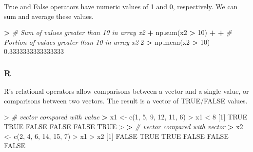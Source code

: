\documentclass[
]{book}
\newenvironment{Shaded}{\begin{snugshade}}{\end{snugshade}}
\newcommand{\BuiltInTok}[1]{#1}
\newcommand{\CommentTok}[1]{\textcolor[rgb]{0.56,0.35,0.01}{\textit{#1}}}
\newcommand{\ConstantTok}[1]{\textcolor[rgb]{0.00,0.00,0.00}{#1}}
\newcommand{\DecValTok}[1]{\textcolor[rgb]{0.00,0.00,0.81}{#1}}
\newcommand{\ErrorTok}[1]{\textcolor[rgb]{0.64,0.00,0.00}{\textbf{#1}}}
\newcommand{\FloatTok}[1]{\textcolor[rgb]{0.00,0.00,0.81}{#1}}
\newcommand{\FunctionTok}[1]{\textcolor[rgb]{0.00,0.00,0.00}{#1}}
\newcommand{\NormalTok}[1]{#1}
\newcommand{\OperatorTok}[1]{\textcolor[rgb]{0.81,0.36,0.00}{\textbf{#1}}}
\newcommand{\OtherTok}[1]{\textcolor[rgb]{0.56,0.35,0.01}{#1}}
\newcommand{\SpecialCharTok}[1]{\textcolor[rgb]{0.00,0.00,0.00}{#1}}
\begin{document}
True and False operators have numeric values of 1 and 0, respectively. We can sum and average these values.

\begin{Shaded}
\begin{Highlighting}[]
\OperatorTok{\textgreater{}} \CommentTok{\# Sum of values greater than 10 in array x2}
\OperatorTok{+}\NormalTok{ np.}\BuiltInTok{sum}\NormalTok{(x2 }\OperatorTok{\textgreater{}} \DecValTok{10}\NormalTok{)}
\OperatorTok{+} 
\OperatorTok{+} \CommentTok{\# Portion of values greater than 10 in array x2}
\DecValTok{2}
\OperatorTok{\textgreater{}}\NormalTok{ np.mean(x2 }\OperatorTok{\textgreater{}} \DecValTok{10}\NormalTok{)}
\FloatTok{0.3333333333333333}
\end{Highlighting}
\end{Shaded}

\hypertarget{r-4}{%
\subsubsection*{R}\label{r-4}}

R's relational operators allow comparisons between a vector and a single value, or comparisons between two vectors. The result is a vector of TRUE/FALSE values.

\begin{Shaded}
\begin{Highlighting}[]
\SpecialCharTok{\textgreater{}} \CommentTok{\# vector compared with value}
\ErrorTok{\textgreater{}}\NormalTok{ x1 }\OtherTok{\textless{}{-}} \FunctionTok{c}\NormalTok{(}\DecValTok{1}\NormalTok{, }\DecValTok{5}\NormalTok{, }\DecValTok{9}\NormalTok{, }\DecValTok{12}\NormalTok{, }\DecValTok{11}\NormalTok{, }\DecValTok{6}\NormalTok{)}
\SpecialCharTok{\textgreater{}}\NormalTok{ x1 }\SpecialCharTok{\textless{}} \DecValTok{8}
\NormalTok{[}\DecValTok{1}\NormalTok{]  }\ConstantTok{TRUE}  \ConstantTok{TRUE} \ConstantTok{FALSE} \ConstantTok{FALSE} \ConstantTok{FALSE}  \ConstantTok{TRUE}
\SpecialCharTok{\textgreater{}} 
\ErrorTok{\textgreater{}} \CommentTok{\# vector compared with vector}
\ErrorTok{\textgreater{}}\NormalTok{ x2 }\OtherTok{\textless{}{-}} \FunctionTok{c}\NormalTok{(}\DecValTok{2}\NormalTok{, }\DecValTok{4}\NormalTok{, }\DecValTok{6}\NormalTok{, }\DecValTok{14}\NormalTok{, }\DecValTok{15}\NormalTok{, }\DecValTok{7}\NormalTok{)}
\SpecialCharTok{\textgreater{}}\NormalTok{ x1 }\SpecialCharTok{\textgreater{}}\NormalTok{ x2}
\NormalTok{[}\DecValTok{1}\NormalTok{] }\ConstantTok{FALSE}  \ConstantTok{TRUE}  \ConstantTok{TRUE} \ConstantTok{FALSE} \ConstantTok{FALSE} \ConstantTok{FALSE}
\end{Highlighting}
\end{Shaded}
\end{document}
